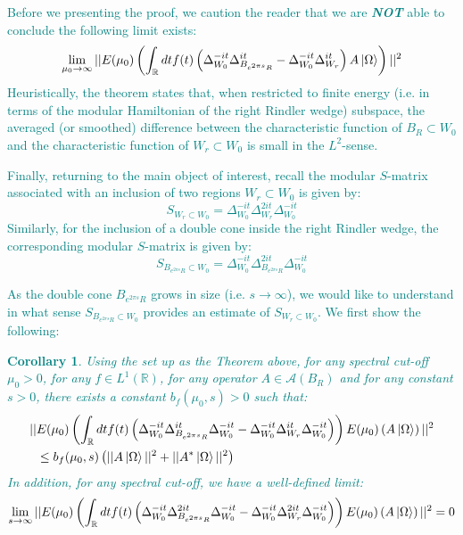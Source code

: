 \documentclass[a4paper,11pt]{article}
\newtheorem{corollary}[theorem]{Corollary}
\theoremstyle{definition}
\newcommand{\lb}{\left(}
\newcommand{\rb}{\right)}
\newcommand{\YC}[1]{\textcolor{teal}{#1}}
\begin{document}
\YC{
Before we presenting the proof, we caution the reader that we are \textit{\textbf{NOT}} able to conclude the following limit exists:
\begin{equation}
    \lim_{\mu_0\rightarrow \infty}||E(\mu_0)\lb\int_\mathbb{R} dt f(t)\lb\Delta_{W_0}^{-it}\Delta_{B_{e^{2\pi s}R}}^{it} - \Delta_{W_0}^{-it}\Delta_{W_r}^{it}\rb A\ket{\Omega}\rb||^2
\end{equation}
Heuristically, the theorem states that, when restricted to finite energy (i.e. in terms of the modular Hamiltonian of the right Rindler wedge) subspace, the averaged (or smoothed) difference between the characteristic function of $B_R\subset W_0$ and the characteristic function of $W_r\subset W_0$ is small in the $L^2$-sense.  
}

\YC{
Finally, returning to the main object of interest, recall the modular $S$-matrix associated with an inclusion of two regions $W_r\subset W_0$ is given by:
\begin{equation}
    S_{W_r\subset W_0} = \Delta_{W_0}^{-it}\Delta_{W_r}^{2it}\Delta_{W_0}^{-it}
\end{equation}
Similarly, for the inclusion of a double cone inside the right Rindler wedge, the corresponding modular $S$-matrix is given by:
\begin{equation}
    S_{B_{e^{2\pi s}R}\subset W_0} = \Delta_{W_0}^{-it}\Delta_{B_{e^{2\pi s}R}}^{2it}\Delta_{W_0}^{-it}
\end{equation}
}

\YC{
As the double cone $B_{e^{2\pi s}R}$ grows in size (i.e. $s\rightarrow \infty$), we would like to understand in what sense $S_{B_{e^{2\pi s}R}\subset W_0}$ provides an estimate of $S_{W_r\subset W_0}$. We first show the following:
\begin{corollary}\label{corollary:doubleup}
    Using the set up as the Theorem above, for any spectral cut-off $\mu_0 > 0$, for any $f\in L^1(\mathbb{R})$, for any operator $A\in\mathcal{A}(B_R)$ and for any constant $s > 0$, there exists a constant $b_f(\mu_0, s) > 0$ such that:
    \begin{align}
        \begin{split}
            ||&E(\mu_0)\lb\int_\mathbb{R} dt f(t) \lb\Delta_{W_0}^{-it}\Delta_{B_{e^{2\pi s}R}}^{it}\Delta_{W_0}^{-it} - \Delta_{W_0}^{-it}\Delta_{W_r}^{it}\Delta_{W_0}^{-it}\rb\rb E(\mu_0)\lb A\ket{\Omega}\rb||^2 \\&\leq b_f(\mu_0, s)\lb||A\ket{\Omega}||^2 + ||A^*\ket{\Omega}||^2\rb
        \end{split}
    \end{align}
    In addition, for any spectral cut-off, we have a well-defined limit:
    \begin{equation}
        \lim_{s\rightarrow\infty}||E(\mu_0)\lb\int_\mathbb{R} dt f(t) \lb\Delta_{W_0}^{-it}\Delta_{B_{e^{2\pi s}R}}^{2it}\Delta_{W_0}^{-it} - \Delta_{W_0}^{-it}\Delta_{W_r}^{2it}\Delta_{W_0}^{-it}\rb\rb E(\mu_0)\lb A\ket{\Omega}\rb||^2 = 0
    \end{equation}
\end{corollary}
}
\end{document}

